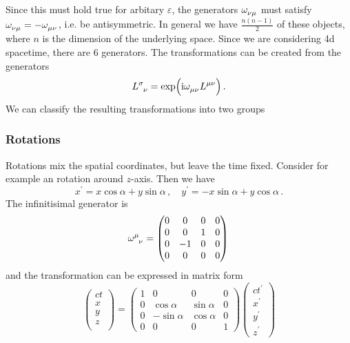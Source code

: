 Since this must hold true for arbitary $\varepsilon$, the generators
$\tensor{\omega}{_\nu_\mu}$ must satisfy
$\tensor{\omega}{_\nu_\mu}=-\tensor{\omega}{_\mu_\nu}$, i.e. be antisymmetric.
In general we have $\frac{n(n-1)}{2}$ of these objects, where $n$ is the
dimension of the underlying space.
Since we are considering 4d spacetime, there are $6$ generators. 
The transformations can be created from the generators
\begin{equation}
\tensor{L}{^\sigma_\nu}=\exp\left(\imI\tensor{\omega}{_\mu_\nu}\tensor{L}{^\mu^\nu}\right)\,.
\end{equation}
We can
classify the resulting transformations into two groups
\subsubsection{Rotations}
Rotations mix the spatial coordinates, but leave the time fixed. Consider for
example an rotation around $z$-axis. Then we have
\begin{equation}
x^\prime=x\cos\alpha+y\sin\alpha \, ,\quad y^\prime=-x\sin\alpha+y\cos\alpha \,
.
\end{equation}
The infinitisimal generator is 
\begin{equation}
 \tensor{\omega}{^\mu_\nu}
  =\begin{pmatrix}
  0&0 & 0&0\\
  0&0 &1&0\\
  0&-1&0 &0\\
  0&0 &0 &0
  \end{pmatrix}\, 
\end{equation}
and the transformation can be expressed in matrix form
\begin{equation}
  \begin{pmatrix}
  ct\\
  x\\
  y\\
  z\\
  \end{pmatrix}=
  \begin{pmatrix}
  1&0 & 0&0\\
  0&\cos\alpha &\sin\alpha&0\\
  0&-\sin\alpha&\cos\alpha &0\\
  0&0 &0 &1
  \end{pmatrix}
  \begin{pmatrix}
  ct^\prime\\
  x^\prime\\
  y^\prime\\
  z^\prime
  \end{pmatrix}
\end{equation}

